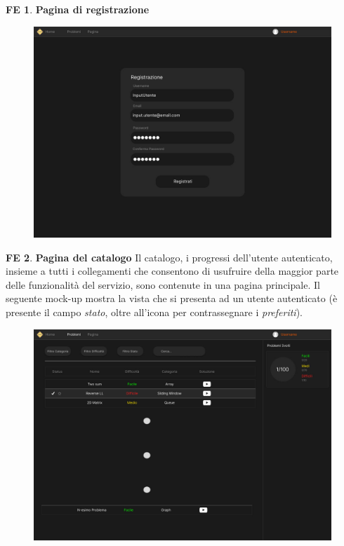 \documentclass[11pt, a4paper]{article}
\theoremstyle{definition}
\newtheorem{frontend}{FE}
\begin{document}
\begin{frontend}
\label{areaexercise}
\textbf{Pagina di registrazione }
\end{frontend}
\begin{figure}[H]
\centering
\includegraphics[scale=0.22]{materiale/immaginife/registrazione.jpeg}
\end{figure}

\newpage
\begin{frontend}
\textbf{Pagina del catalogo }
Il catalogo, i progressi dell'utente autenticato, insieme a tutti i
collegamenti che consentono di usufruire della maggior parte delle
funzionalità del servizio, sono contenute in una pagina principale.
Il seguente mock-up mostra la vista che si presenta ad un utente
autenticato (è presente il campo \textit{stato}, oltre all'icona per
contrassegnare i \textit{preferiti}).
\end{frontend}
\begin{figure}[H]
\centering
\includegraphics[scale=0.195]{materiale/immaginife/homecatalogo.jpeg}
\end{figure}
\end{document}
